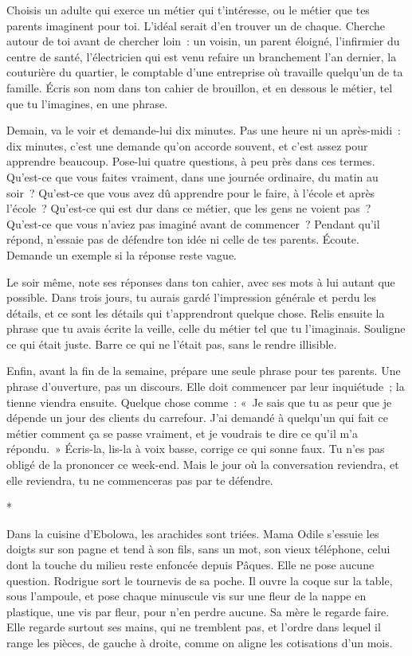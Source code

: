 \documentclass[10.5pt,twoside,openright]{book}
\newcommand{\asterisme}{\par\vspace{0.7em}\centerline{\color{gris}*\quad*\quad*}\vspace{0.7em}\par\noindent}
\begin{document}
Choisis un adulte qui exerce un métier qui t’intéresse, ou le métier que tes parents imaginent pour toi. L’idéal serait d’en trouver un de chaque. Cherche autour de toi avant de chercher loin : un voisin, un parent éloigné, l’infirmier du centre de santé, l’électricien qui est venu refaire un branchement l’an dernier, la couturière du quartier, le comptable d’une entreprise où travaille quelqu’un de ta famille. Écris son nom dans ton cahier de brouillon, et en dessous le métier, tel que tu l’imagines, en une phrase.

Demain, va le voir et demande-lui dix minutes. Pas une heure ni un après-midi : dix minutes, c’est une demande qu’on accorde souvent, et c’est assez pour apprendre beaucoup. Pose-lui quatre questions, à peu près dans ces termes. Qu’est-ce que vous faites vraiment, dans une journée ordinaire, du matin au soir ? Qu’est-ce que vous avez dû apprendre pour le faire, à l’école et après l’école ? Qu’est-ce qui est dur dans ce métier, que les gens ne voient pas ? Qu’est-ce que vous n’aviez pas imaginé avant de commencer ? Pendant qu’il répond, n’essaie pas de défendre ton idée ni celle de tes parents. Écoute. Demande un exemple si la réponse reste vague.

Le soir même, note ses réponses dans ton cahier, avec ses mots à lui autant que possible. Dans trois jours, tu aurais gardé l’impression générale et perdu les détails, et ce sont les détails qui t’apprendront quelque chose. Relis ensuite la phrase que tu avais écrite la veille, celle du métier tel que tu l’imaginais. Souligne ce qui était juste. Barre ce qui ne l’était pas, sans le rendre illisible.

Enfin, avant la fin de la semaine, prépare une seule phrase pour tes parents. Une phrase d’ouverture, pas un discours. Elle doit commencer par leur inquiétude ; la tienne viendra ensuite. Quelque chose comme : « Je sais que tu as peur que je dépende un jour des clients du carrefour. J’ai demandé à quelqu’un qui fait ce métier comment ça se passe vraiment, et je voudrais te dire ce qu’il m’a répondu. » Écris-la, lis-la à voix basse, corrige ce qui sonne faux. Tu n’es pas obligé de la prononcer ce week-end. Mais le jour où la conversation reviendra, et elle reviendra, tu ne commenceras pas par te défendre.

\asterisme

Dans la cuisine d’Ebolowa, les arachides sont triées. Mama Odile s’essuie les doigts sur son pagne et tend à son fils, sans un mot, son vieux téléphone, celui dont la touche du milieu reste enfoncée depuis Pâques. Elle ne pose aucune question. Rodrigue sort le tournevis de sa poche. Il ouvre la coque sur la table, sous l’ampoule, et pose chaque minuscule vis sur une fleur de la nappe en plastique, une vis par fleur, pour n’en perdre aucune. Sa mère le regarde faire. Elle regarde surtout ses mains, qui ne tremblent pas, et l’ordre dans lequel il range les pièces, de gauche à droite, comme on aligne les cotisations d’un mois.
\end{document}
